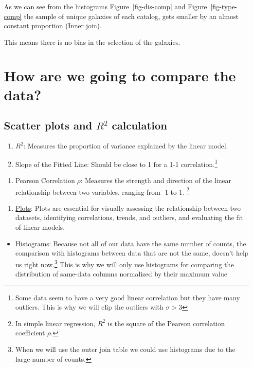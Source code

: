 \documentclass[
]{article}
\providecommand{\tightlist}{%
  \setlength{\itemsep}{0pt}\setlength{\parskip}{0pt}}\usepackage{longtable,booktabs,array}
\begin{document}
As we can see from the histograms Figure~\ref{fig-dis-comp} and
Figure~\ref{fig-type-comp} the sample of unique galaxies of each
catalog, gets smaller by an almost constant proportion (Inner join).

This means there is no bias in the selection of the galaxies.

\section{How are we going to compare the
data?}\label{how-are-we-going-to-compare-the-data}

\subsection{\texorpdfstring{Scatter plots and \(R^2\)
calculation}{Scatter plots and R\^{}2 calculation}}\label{scatter-plots-and-r2-calculation}

\begin{enumerate}
\def\labelenumi{\arabic{enumi}.}
\tightlist
\item
  \(R^2\): Measures the proportion of variance explained by the linear
  model.
\item
  Slope of the Fitted Line: Should be close to 1 for a 1-1
  correlation.\footnote{Some data seem to have a very good linear
    correlation but they have many outliers. This is why we will clip
    the outliers with \(\sigma > 3\)}
\end{enumerate}

\begin{enumerate}
\def\labelenumi{\arabic{enumi}.}
\setcounter{enumi}{2}
\tightlist
\item
  Pearson Correlation \(\rho\): Measures the strength and direction of
  the linear relationship between two variables, ranging from -1 to 1.
  \footnote{In simple linear regression, \(R^2\) is the square of the
    Pearson correlation coefficient \(\rho\).}
\end{enumerate}

\begin{enumerate}
\def\labelenumi{\arabic{enumi}.}
\setcounter{enumi}{3}
\tightlist
\item
  \ul{Plots}: Plots are essential for visually assessing the
  relationship between two datasets, identifying correlations, trends,
  and outliers, and evaluating the fit of linear models.
\end{enumerate}

\begin{itemize}
\tightlist
\item
  Histograms: Because not all of our data have the same number of
  counts, the comparison with histograms between data that are not the
  same, doesn't help us right now.\footnote{When we will use the outer
    join table we could use histograms due to the large number of
    counts.} This is why we will only use histograms for comparing the
  distribution of same-data columns normalized by their maximum value
\end{itemize}
\end{document}
